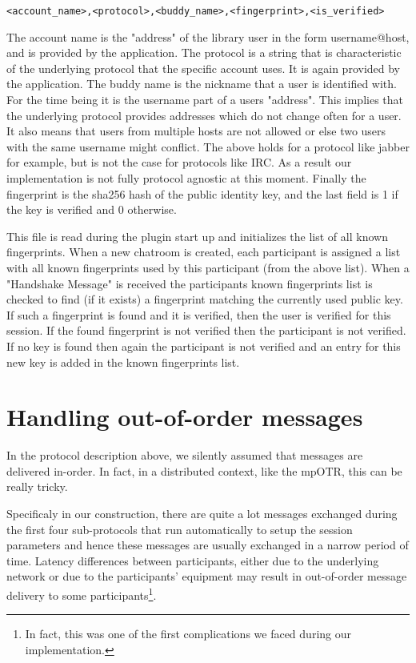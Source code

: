 \begin{verbatim}
<account_name>,<protocol>,<buddy_name>,<fingerprint>,<is_verified>
\end{verbatim}

The account name is the "address" of the library user in the form username@host, and is provided by the application.
The protocol is a string that is characteristic of the underlying protocol that the specific account uses.
It is again provided by the application.
The buddy name is the nickname that a user is identified with.
For the time being it is the username part of a users "address".
This implies that the underlying protocol provides addresses which do not change often for a user.
It also means that users from multiple hosts are not allowed or else two users with the same username might conflict.
The above holds for a protocol like jabber for example, but is not the case for protocols like IRC.
As a result our implementation is not fully protocol agnostic at this moment.
Finally the fingerprint is the sha256 hash of the public identity key, and the last field is 1 if the key is verified and 0 otherwise.

This file is read during the plugin start up and initializes the list of all known fingerprints.
When a new chatroom is created, each participant is assigned a list with all known fingerprints used by this participant (from the above list).
When a "Handshake Message" is received the participants known fingerprints list is checked to find (if it exists) a fingerprint matching the currently used public key.
If such a fingerprint is found and it is verified, then the user is verified for this session.
If the found fingerprint is not verified then the participant is not verified.
If no key is found then again the participant is not verified and an entry for this new key is added in the known fingerprints list. 

\section{Handling out-of-order messages}
In the protocol description above, we silently assumed that messages are delivered in-order. In fact, in a distributed context, like the mpOTR, this can be really tricky.

Specificaly in our construction, there are quite a lot messages exchanged during the first four sub-protocols that run automatically to setup the session parameters and hence these messages are usually exchanged in a narrow period of time. Latency differences between participants, either due to the underlying network or due to the participants' equipment may result in out-of-order message delivery to some participants\footnote{In fact, this was one of the first complications we faced during our implementation.}.

